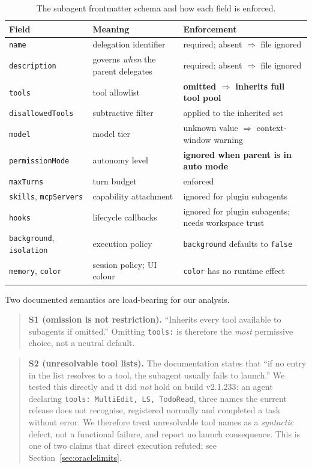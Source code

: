 \documentclass[smallextended,natbib]{svjour3}
\newcommand{\code}[1]{\texttt{\small #1}}
\begin{document}
\begin{table}[t]
\caption{The subagent frontmatter schema and how each field is enforced.}
\label{tab:schema}
\footnotesize
\begin{tabular}{@{}>{\raggedright\arraybackslash}p{2.4cm}>{\raggedright\arraybackslash}p{3.1cm}>{\raggedright\arraybackslash}p{5.5cm}@{}}
\toprule
\textbf{Field} & \textbf{Meaning} & \textbf{Enforcement} \\
\midrule
\code{name} & delegation identifier & required; absent $\Rightarrow$ file ignored \\
\code{description} & governs \emph{when} the parent delegates & required; absent $\Rightarrow$ file ignored \\
\code{tools} & tool allowlist & \textbf{omitted $\Rightarrow$ inherits full tool pool} \\
\code{disallowedTools} & subtractive filter & applied to the inherited set \\
\code{model} & model tier & unknown value $\Rightarrow$ context-window warning \\
\code{permissionMode} & autonomy level & \textbf{ignored when parent is in auto mode} \\
\code{maxTurns} & turn budget & enforced \\
\code{skills}, \code{mcpServers} & capability attachment & ignored for plugin subagents \\
\code{hooks} & lifecycle callbacks & ignored for plugin subagents; needs workspace trust \\
\code{background}, \code{isolation} & execution policy & \code{background} defaults to \code{false} \\
\code{memory}, \code{color} & session policy; UI colour & \code{color} has no runtime effect \\
\bottomrule
\end{tabular}
\end{table}

Two documented semantics \citep{anthropic2026docs} are load-bearing for our analysis.

\begin{quote}
\textbf{S1 (omission is not restriction).} ``Inherits every tool available to subagents if omitted.''
Omitting \code{tools:} is therefore the \emph{most} permissive choice, not a neutral default.
\end{quote}
\begin{quote}
\textbf{S2 (unresolvable tool lists).} The documentation states that ``if no entry in the list
resolves to a tool, the subagent usually fails to launch.'' We tested this directly and it did
\emph{not} hold on build v2.1.233: an agent declaring \code{tools: MultiEdit, LS, TodoRead}, three
names the current release does not recognise, registered normally and completed a task without
error. We therefore treat unresolvable tool names as a \emph{syntactic} defect, not a functional
failure, and report no launch consequence. This is one of two claims that direct execution
refuted; see Section~\ref{sec:oraclelimits}.
\end{quote}
\end{document}
